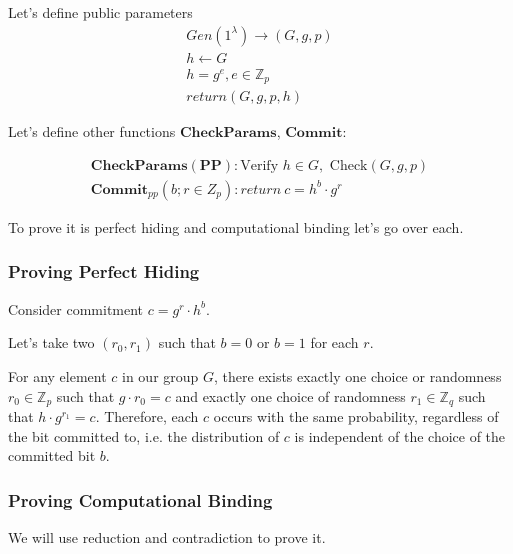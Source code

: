 \documentclass{article}
\begin{document}
Let's define public parameters
\begin{align*}
    Gen(1^\lambda) \rightarrow (G,g,p) \\
    h \leftarrow G \\
    h = g^e, e \in \mathbb Z_p \\
    return (G,g,p,h)
\end{align*}

Let's define other functions $\mathbf{CheckParams}$, $\mathbf{Commit}$:

\begin{align*}
    \mathbf{CheckParams(PP)}: \text{Verify } h \in G, \text{ Check}(G,g,p) \\
    \mathbf{Commit}_{pp}(b;r \in Z_p): return \: c = h^b \cdot g^r
\end{align*}

To prove it is perfect hiding and computational binding let's go over each.

\subsubsection{Proving Perfect Hiding}

Consider commitment $c = g^r \cdot h^b$.

Let's take two $(r_0, r_1)$ such that $b = 0$ or $b = 1$ for each $r$.

For any element $c$ in our group $G$, there exists exactly one choice or randomness $r_0 \in \mathbb Z_p$ such that $g \cdot r_0 = c$ and exactly one choice of randomness $r_1 \in \mathbb Z_q$ such that $h \cdot g^{r_1} = c$. Therefore, each $c$ occurs with the same probability, regardless of the bit committed to, i.e. the distribution of $c$ is independent of the choice of the committed bit $b$.


\subsubsection{Proving Computational Binding}\label{dl-comp-binding-proof}

We will use reduction and contradiction to prove it.
\end{document}
